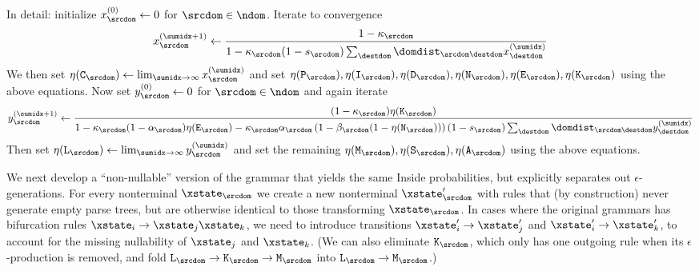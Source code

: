 In detail: initialize $x_\srcdom^{(0)} \leftarrow 0$ for $\srcdom \in \ndom$.
Iterate to convergence
\[
    x_\srcdom^{(\sumidx+1)}
    \leftarrow
    \frac{1 - \kappa_\srcdom}{1 - \kappa_\srcdom (1 - \tok_\srcdom)\sum_\destdom \domdist_{\srcdom\destdom} x_\destdom^{(\sumidx)}}
\]
We then set $\nullability(\ntchild_\srcdom) \leftarrow \lim_{\sumidx \to \infty} x_\srcdom^{(\sumidx)}$
and set $\nullability(\ntparent_\srcdom), \nullability(\ntins_\srcdom), \nullability(\ntdel_\srcdom), \nullability(\ntnew_\srcdom), \nullability(\ntexp_\srcdom), \nullability(\ntimm_\srcdom)$ using the above equations.
Now set $y_\srcdom^{(0)} \leftarrow 0$ for $\srcdom \in \ndom$
and again iterate
\[
    y_\srcdom^{(\sumidx+1)} \leftarrow \frac{(1 - \kappa_\srcdom) \nullability(\ntimm_\srcdom)}{1 - \kappa_\srcdom (1 - \alpha_\srcdom) \nullability(\ntexp_\srcdom) 
      - \kappa_\srcdom \alpha_\srcdom  
      \left( 1 - \beta_\srcdom(1 - \nullability(\ntnew_\srcdom)) \right)
     (1 - \tok_\srcdom) \sum_\destdom \domdist_{\srcdom\destdom} y_\destdom^{(\sumidx)}
      }
\]
Then set
$\nullability(\ntlinks_\srcdom) \leftarrow \lim_{\sumidx \to \infty} y_\srcdom^{(\sumidx)}$
and set the remaining $\nullability(\ntmor_\srcdom), \nullability(\ntsur_\srcdom), \nullability(\ntaln_\srcdom)$ using the above equations.

We next develop a ``non-nullable'' version of the grammar that yields the same Inside
probabilities, but explicitly separates out $\epsilon$-generations.
For every nonterminal $\xstate_\srcdom$ we create a new nonterminal $\xstate'_\srcdom$
with rules that (by construction) never generate empty parse trees,
but are otherwise identical to those transforming $\xstate_\srcdom$.
In cases where the original grammars has bifurcation rules $\xstate_i \to \xstate_j \xstate_k$,
we need to introduce transitions $\xstate'_i \to \xstate'_j$ and $\xstate'_i \to \xstate'_k$,
to account for the missing nullability of $\xstate_j$ and $\xstate_k$.
(We can also eliminate $\ntimm_\srcdom$, which only has one outgoing rule
when its $\epsilon$-production is removed, and fold $\ntlinks_\srcdom\to\ntimm_\srcdom\to\ntmor_\srcdom$ into $\ntlinks_\srcdom\to\ntmor_\srcdom$.)


